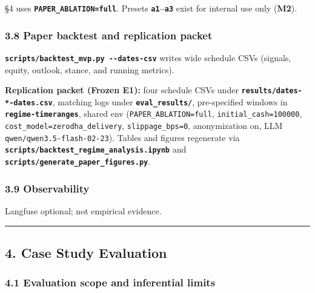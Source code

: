 \documentclass[
]{article}
\begin{document}
§4 uses \textbf{\texttt{PAPER\_ABLATION=full}}. Presets
\textbf{\texttt{a1}--\texttt{a3}} exist for internal use only
(\textbf{M2}).

\subsubsection{3.8 Paper backtest and replication
packet}\label{paper-backtest-and-replication-packet}

\textbf{\texttt{scripts/backtest\_mvp.py\ -\/-dates-csv}} writes wide
schedule CSVs (signals, equity, outlook, stance, and running metrics).

\textbf{Replication packet (Frozen E1):} four schedule CSVs under
\textbf{\texttt{results/dates-*-dates.csv}}, matching logs under
\textbf{\texttt{eval\_results/}}, pre-specified windows in
\textbf{\texttt{regime-timeranges}}, shared env
(\texttt{PAPER\_ABLATION=full}, \texttt{initial\_cash=100000},
\texttt{cost\_model=zerodha\_delivery}, \texttt{slippage\_bps=0},
anonymization on, LLM \texttt{qwen/qwen3.5-flash-02-23}). Tables and
figures regenerate via
\textbf{\texttt{scripts/backtest\_regime\_analysis.ipynb}} and
\textbf{\texttt{scripts/generate\_paper\_figures.py}}.

\subsubsection{3.9 Observability}\label{observability}

Langfuse optional; not empirical evidence.

\begin{center}\rule{0.5\linewidth}{0.5pt}\end{center}

\subsection{4. Case Study Evaluation}\label{case-study-evaluation}

\subsubsection{4.1 Evaluation scope and inferential
limits}\label{evaluation-scope-and-inferential-limits}
\end{document}
